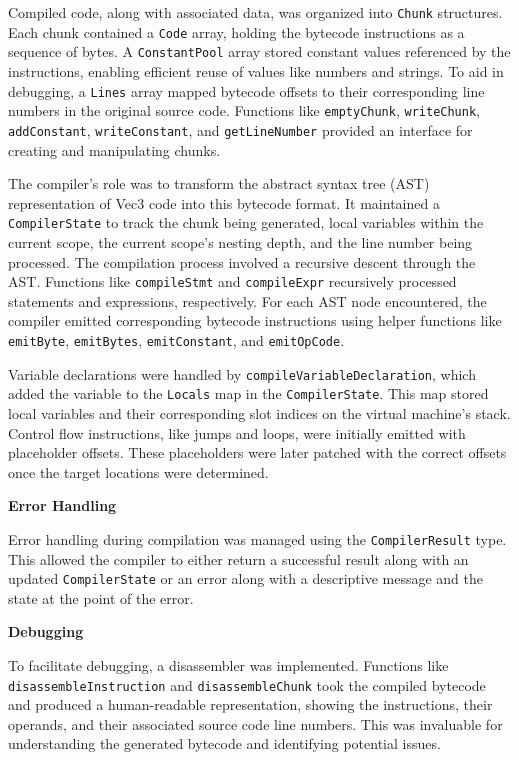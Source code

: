 Compiled code, along with associated data, was organized into \texttt{Chunk} structures. 
Each chunk contained a \texttt{Code} array, holding the bytecode instructions as a sequence of bytes. 
A \texttt{ConstantPool} array stored constant values referenced by the instructions, enabling efficient reuse of values like numbers and strings. 
To aid in debugging, a \texttt{Lines} array mapped bytecode offsets to their corresponding line numbers in the original source code. 
Functions like \texttt{emptyChunk}, \texttt{writeChunk}, \texttt{addConstant}, \texttt{writeConstant}, and \texttt{getLineNumber} provided an interface for creating and manipulating chunks.

The compiler's role was to transform the abstract syntax tree (AST) representation of Vec3 code into this bytecode format. 
It maintained a \texttt{CompilerState} to track the chunk being generated, local variables within the current scope, the current scope's nesting depth, and the line number being processed. 
The compilation process involved a recursive descent through the AST. Functions like \texttt{compileStmt} and \texttt{compileExpr} recursively processed statements and expressions, respectively. 
For each AST node encountered, the compiler emitted corresponding bytecode instructions using helper functions like \texttt{emitByte}, \texttt{emitBytes}, \texttt{emitConstant}, and \texttt{emitOpCode}.

Variable declarations were handled by \texttt{compileVariableDeclaration}, which added the variable to the \texttt{Locals} map in the \texttt{CompilerState}. 
This map stored local variables and their corresponding slot indices on the virtual machine's stack. 
Control flow instructions, like jumps and loops, were initially emitted with placeholder offsets. 
These placeholders were later patched with the correct offsets once the target locations were determined.

\textbf{Error Handling}

Error handling during compilation was managed using the \texttt{CompilerResult} type. 
This allowed the compiler to either return a successful result along with an updated \texttt{CompilerState} or an error along with a descriptive message and the state at the point of the error.

\textbf{Debugging}

To facilitate debugging, a disassembler was implemented. 
Functions like \texttt{disassembleInstruction} and \texttt{disassembleChunk} took the compiled bytecode and produced a human-readable representation, showing the instructions, their operands, and their associated source code line numbers. 
This was invaluable for understanding the generated bytecode and identifying potential issues.


